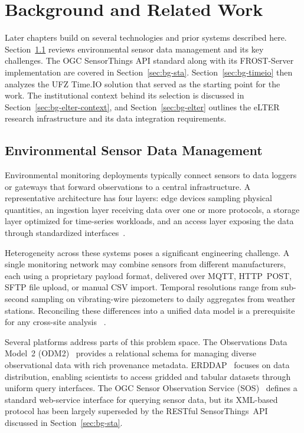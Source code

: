 \chapter{Background and Related Work}
\label{chap:background}

Later chapters build on several technologies and prior systems described here.
Section~\ref{sec:bg-sensor-data} reviews environmental sensor data management and its key challenges.
The OGC SensorThings API standard along with its FROST-Server implementation are covered in
Section~\ref{sec:bg-sta}. Section~\ref{sec:bg-timeio} then analyzes the UFZ Time.IO solution
that served as the starting point for the work. The institutional context behind its selection
is discussed in Section~\ref{sec:bg-elter-context}, and Section~\ref{sec:bg-elter} outlines
the eLTER research infrastructure and its data integration requirements.

\section{Environmental Sensor Data Management}
\label{sec:bg-sensor-data}

Environmental monitoring deployments typically connect sensors to data loggers or gateways
that forward observations to a central infrastructure. A representative architecture has four layers:
edge devices sampling physical quantities, an ingestion layer receiving data over one or more
protocols, a storage layer optimized for time-series workloads, and an access layer exposing the
data through standardized interfaces~\cite{hart2006environmental}.

Heterogeneity across these systems poses a significant engineering challenge. A single monitoring network
may combine sensors from different manufacturers, each using a proprietary payload format, delivered
over MQTT, HTTP~POST, SFTP file upload, or manual CSV import. Temporal resolutions range from
sub-second sampling on vibrating-wire piezometers to daily aggregates from weather stations.
Reconciling these differences into a unified data model is a prerequisite for any cross-site analysis
~\cite{horsburgh2008observations}.

Several platforms address parts of this problem space. The Observations Data Model~2 (ODM2)~\cite{horsburgh2016odm2} provides a relational schema for managing diverse observational data with
rich provenance metadata. ERDDAP~\cite{simons2023erddap} focuses on data distribution, enabling
scientists to access gridded and tabular datasets through uniform query interfaces. The OGC Sensor
Observation Service (SOS)~\cite{ogcsos} defines a standard web-service interface for querying sensor
data, but its XML-based protocol has been largely superseded by the RESTful SensorThings~API discussed
in Section~\ref{sec:bg-sta}.

